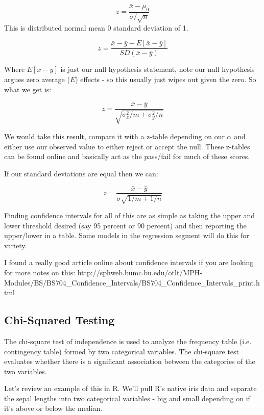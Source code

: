 \documentclass[12pt]{article}\usepackage[]{graphicx}\usepackage[]{color}
\begin{document}
\begin{flushleft}
$$ z = \frac{\bar{x} - \mu_0}{\sigma / \sqrt{n}} $$ This is distributed normal mean 0 standard deviation of 1.


$$ z = \frac{ \bar{x} - \bar{y} - E[\bar{x}-\bar{y}]}{SD(\bar{x}-\bar{y})} $$

Where $E[\bar{x}-\bar{y}]$ is just our null hypothesis statement, note our null hypothesis argues zero average ($E$) effects - so this usually just wipes out given the zero. So what we get is:

$$ z = \frac{\bar{x}-\bar{y} }{\sqrt{\sigma_x^2/m  + \sigma_y^2/n}} $$

We would take this result, compare it with a z-table depending on our $\alpha$ and either use our observed value to either reject or accept the null. These z-tables can be found online and basically act as the pass/fail for much of these scores.

If our standard deviations are equal then we can:

$$ z = \frac{\bar{x}-\bar{y} }{\sigma \sqrt{1/m  + 1/n}} $$

Finding confidence intervals for all of this are as simple as taking the upper and lower threshold desired (say 95 percent or 90 percent) and then reporting the upper/lower in a table. Some models in the regression segment will do this for variety.

I found a really good article online about confidence intervals if you are looking for more notes on this:
http://sphweb.bumc.bu.edu/otlt/MPH-Modules/BS/BS704_Confidence_Intervals/BS704_Confidence_Intervals_print.html

\subsection{Chi-Squared Testing}

The chi-square test of independence is used to analyze the frequency table (i.e. contingency table) formed by two categorical variables. The chi-square test evaluates whether there is a significant association between the categories of the two variables.

Let's review an example of this in R. We'll pull R's native iris data and separate the sepal lengths into two categorical variables - big and small depending on if it's above or below the median.


\end{flushleft}
\end{document}
